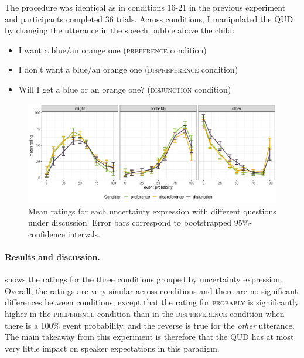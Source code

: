 The procedure was identical as in conditions 16-21 in the previous experiment and participants
completed 36 trials. Across conditions, I manipulated the QUD by changing the utterance in
the speech bubble above the child:
\begin{itemize}
\item I want a blue/an orange one (\textsc{preference} condition)
\item I don't want a blue/an orange one  (\textsc{dispreference} condition)
\item Will I get a blue or an orange one? (\textsc{disjunction} condition)
\end{itemize}

\begin{figure}
\includegraphics[width=\textwidth]{plots/pre-test-qud.pdf}
\caption{Mean ratings for each uncertainty expression with different questions under discussion. Error bars correspond to bootstrapped 95\%-confidence intervals. \label{fig:norning-qud}}
\end{figure}


\paragraph{Results and discussion.}  shows the ratings for the three conditions grouped by uncertainty expression. Overall, the ratings
are very similar across conditions and there are no significant differences between conditions, except that the rating for \textsc{probably} is significantly
higher in the \textsc{preference} condition than in the \textsc{dispreference} condition when there is a 100\% event probability, and the reverse is true for
the \emph{other} utterance. The main takeaway from this experiment is therefore that the QUD has at most very little impact on speaker expectations in
this paradigm. 


